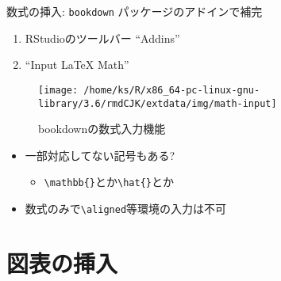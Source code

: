 \documentclass[
  12pt,
  ignorenonframetext,
]{beamer}
\providecommand{\tightlist}{%
  \setlength{\itemsep}{0pt}\setlength{\parskip}{0pt}}
\begin{document}
\begin{frame}[fragile]{数式の挿入: \texttt{bookdown}
パッケージのアドインで補完}
\protect\hypertarget{ux6570ux5f0fux306eux633fux5165-bookdown-ux30d1ux30c3ux30b1ux30fcux30b8ux306eux30a2ux30c9ux30a4ux30f3ux3067ux88dcux5b8c}{}

\begin{enumerate}
\tightlist
\item
  RStudioのツールバー ``Addins''
\item
  ``Input LaTeX Math''
\end{enumerate}

\begin{figure}

{\centering \texttt{[image: /home/ks/R/x86\_64-pc-linux-gnu-library/3.6/rmdCJK/extdata/img/math-input]} 

}

\caption{bookdownの数式入力機能}\label{fig:math-input}
\end{figure}

\begin{itemize}
\tightlist
\item
  一部対応してない記号もある?

  \begin{itemize}
  \tightlist
  \item
    \texttt{\textbackslash{}mathbb\{\}}とか\texttt{\textbackslash{}hat\{\}}とか
  \end{itemize}
\item
  数式のみで\texttt{\textbackslash{}aligned}等環境の入力は不可
\end{itemize}

\end{frame}

\hypertarget{ux56f3ux8868ux306eux633fux5165}{%
\section{図表の挿入}\label{ux56f3ux8868ux306eux633fux5165}}
\end{document}
